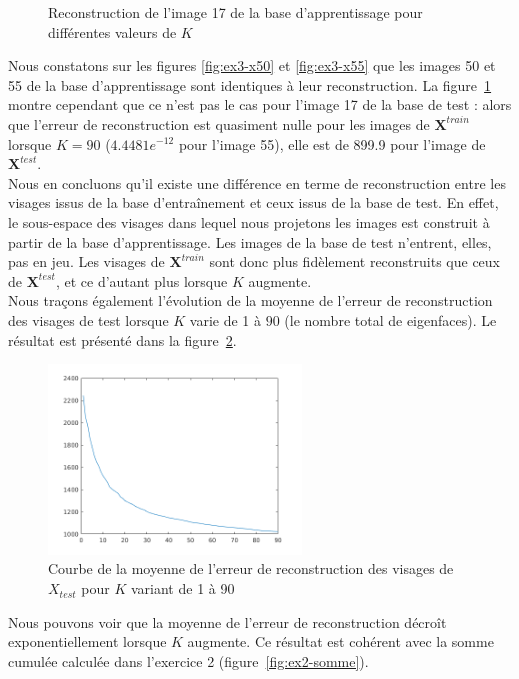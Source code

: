 \documentclass[a4paper]{article}
\newcommand{\figref}[1]{figure~\ref{#1}}
\begin{document}
\begin{figure}[H]
    \caption{Reconstruction de l'image 17 de la base d'apprentissage pour
    différentes valeurs de $K$} 
    \label{fig:ex3-x17}
\end{figure}

Nous constatons sur les figures \ref{fig:ex3-x50} et \ref{fig:ex3-x55} que les
images 50 et 55 de la base d'apprentissage sont identiques à leur
reconstruction. La \figref{fig:ex3-x17} montre cependant que ce n'est pas le cas
pour l'image 17 de la base de test : alors que l'erreur de reconstruction est
quasiment nulle pour les images de $\mathbf{X}^{train}$ lorsque $K=90$
($4.4481e^{-12}$ pour l'image 55), elle est de 899.9 pour l'image de
$\mathbf{X}^{test}$.\\

Nous en concluons qu'il existe une différence en terme de reconstruction entre
les visages issus de la base d'entraînement et ceux issus de la base de test. En
effet, le sous-espace des visages dans lequel nous projetons les images est
construit à partir de la base d'apprentissage. Les images de la base de test
n'entrent, elles, pas en jeu. Les visages de $\mathbf{X}^{train}$ sont donc plus
fidèlement reconstruits que ceux de $\mathbf{X}^{test}$, et ce d'autant plus
lorsque $K$ augmente. \\

Nous traçons également l’évolution de la moyenne de l’erreur de reconstruction
des visages de test lorsque $K$ varie de 1 à $90$ (le nombre total de
eigenfaces). Le résultat est présenté dans la \figref{fig:ex3-erreur}.

\begin{figure}[H]
    \center
    \includegraphics[width=0.6\textwidth]{images/ex3_erreur.png}
    \caption{Courbe de la moyenne de l'erreur de reconstruction des visages
    de $X_{test}$ pour $K$ variant de 1 à 90}
    \label{fig:ex3-erreur}
\end{figure}

Nous pouvons voir que la moyenne de l'erreur de reconstruction décroît
exponentiellement lorsque $K$ augmente. Ce résultat est cohérent avec la somme
cumulée calculée dans l'exercice 2 (\figref{fig:ex2-somme}).
\end{document}
